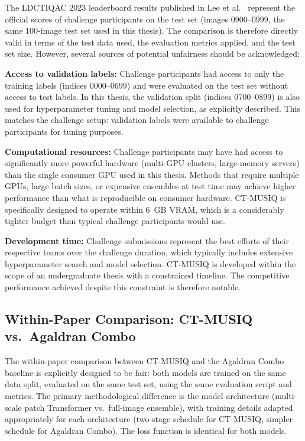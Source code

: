 The LDCTIQAC 2023 leaderboard results published in Lee et al.\ \cite{lee2025ldctiqac}
represent the official scores of challenge participants on the test set (images
0900--0999, the same 100-image test set used in this thesis). The comparison is therefore
directly valid in terms of the test data used, the evaluation metrics applied, and the
test set size. However, several sources of potential unfairness should be acknowledged:

\textbf{Access to validation labels:} Challenge participants had access to only
the training labels (indices 0000--0699) and were evaluated on the test set without
access to test labels. In this thesis, the validation split (indices 0700--0899) is also
used for hyperparameter tuning and model selection, as explicitly described. This matches
the challenge setup: validation labels were available to challenge participants for
tuning purposes.

\textbf{Computational resources:} Challenge participants may have had access to
significantly more powerful hardware (multi-GPU clusters, large-memory servers) than the
single consumer GPU used in this thesis. Methods that require multiple GPUs, large batch
sizes, or expensive ensembles at test time may achieve higher performance than what is
reproducible on consumer hardware. CT-MUSIQ is specifically designed to operate within
6~GB VRAM, which is a considerably tighter budget than typical challenge participants
would use.

\textbf{Development time:} Challenge submissions represent the best efforts of their
respective teams over the challenge duration, which typically includes extensive
hyperparameter search and model selection. CT-MUSIQ is developed within the scope of an
undergraduate thesis with a constrained timeline. The competitive performance achieved
despite this constraint is therefore notable.

\subsection{Within-Paper Comparison: CT-MUSIQ vs.\ Agaldran Combo}

The within-paper comparison between CT-MUSIQ and the Agaldran Combo baseline is
explicitly designed to be fair: both models are trained on the same data split, evaluated
on the same test set, using the same evaluation script and metrics. The primary
methodological difference is the model architecture (multi-scale patch Transformer vs.\
full-image ensemble), with training details adapted appropriately for each architecture
(two-stage schedule for CT-MUSIQ, simpler schedule for Agaldran Combo). The loss
function is identical for both models.

